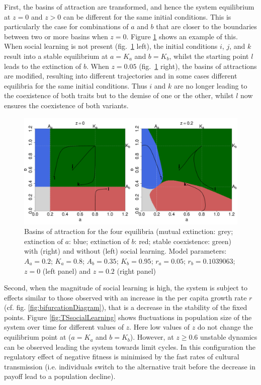 \documentclass[review,authoryear]{elsarticle}
\begin{document}
First, the basins of attraction are transformed, and hence the system equilibrium at $z=0$ and $z>0$ can be different for the same initial conditions. This is particularly the case for combinations of $a$ and $b$ that are closer to the boundaries between two or more basins when $z=0$.  Figure \ref{fig:TransmissionBasin} shows an example of this. When social learning is not present (fig.~\ref{fig:TransmissionBasin} left), the initial conditions $i$, $j$, and $k$ result into a stable equilibrium at $a=K_a$ and $b=K_b$, whilst the starting point $l$ leads to the extinction of $b$. When $z=0.05$ (fig.~\ref{fig:TransmissionBasin} right), the basins of attractions are modified, resulting into different trajectories and in some cases different equilibria for the same initial conditions. Thus $i$ and $k$ are no longer leading to the coexistence of both traits but to the demise of one or the other, whilst $l$ now ensures the coexistence of both variants. 

\begin{figure}
  \centering
      \includegraphics[width=\columnwidth]{./figures/figure3.pdf}
  \caption{Basins of attraction for the four equilibria (mutual extinction: grey; extinction of $a$: blue; extinction of $b$: red; stable coexistence: green) with (right) and without (left) social learning. Model parameters: $A_a=0.2$; $K_a=0.8$; $A_b=0.35$; $K_b=0.95$; $r_a=0.05$; $r_b=0.1039063$; $z=0$ (left panel) and $z=0.2$ (right panel) } 
    \label{fig:TransmissionBasin}
\end{figure}


Second, when the magnitude of social learning is high, the system is subject to effects similar to those observed with an increase in the per capita growth rate $r$ (cf. fig. \ref{fig:bifurcationDiagram}), that is a decrease in the stability of the fixed points. Figure \ref{fig:TSsocialLearning} shows fluctuations in population size of the system over time for different values of $z$. Here low values of $z$ do not change the equilibrium point at ($a=K_a$ and $b=K_b$). However, at $z \geq 0.6$ unstable dynamics can be observed leading the system towards limit cycles. In this configuration the regulatory effect of negative fitness is minimised by the fast rates of cultural transmission (i.e. individuals switch to the alternative trait before the decrease in payoff lead to a population decline).
\end{document}
